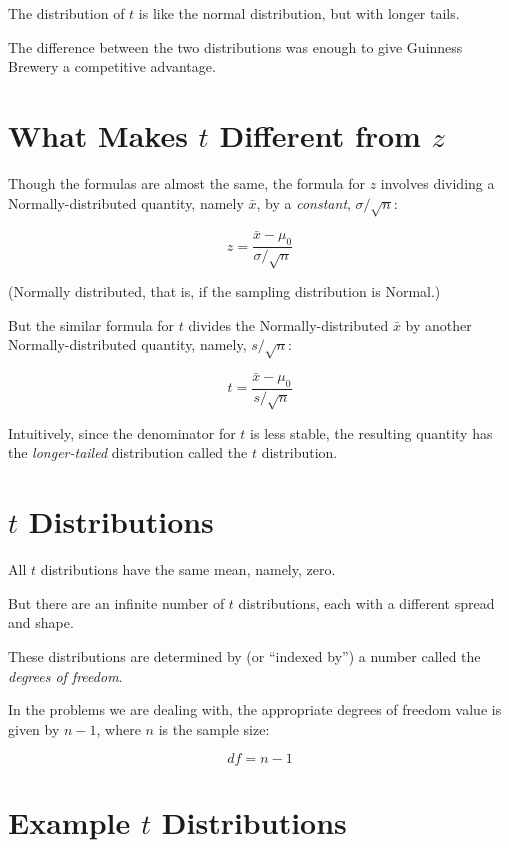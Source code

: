 \documentclass[
  letterpaper,
  DIV=11,
  numbers=noendperiod]{scrreprt}
\begin{document}
The distribution of \(t\) is like the normal distribution, but with
longer tails.

The difference between the two distributions was enough to give Guinness
Brewery a competitive advantage.

\section{\texorpdfstring{What Makes \(t\) Different from
\(z\)}{What Makes t Different from z}}\label{what-makes-t-different-from-z-1}

Though the formulas are almost the same, the formula for \(z\) involves
dividing a Normally-distributed quantity, namely \(\bar{x}\), by a
\emph{constant}, \(\sigma/\sqrt{n}\):

\[
z = \frac{\bar{x} - \mu_0}{\sigma/\sqrt{n}}
\]

(Normally distributed, that is, if the sampling distribution is Normal.)

But the similar formula for \(t\) divides the Normally-distributed
\(\bar{x}\) by another Normally-distributed quantity, namely,
\(s/\sqrt{n}\):

\[
t = \frac{\bar{x} - \mu_0}{s/\sqrt{n}}
\]

Intuitively, since the denominator for \(t\) is less stable, the
resulting quantity has the \emph{longer-tailed} distribution called the
\(t\) distribution.

\section{\texorpdfstring{\(t\)
Distributions}{t Distributions}}\label{t-distributions-1}

All \(t\) distributions have the same mean, namely, zero.

But there are an infinite number of \(t\) distributions, each with a
different spread and shape.

These distributions are determined by (or ``indexed by'') a number
called the \emph{degrees of freedom}.

In the problems we are dealing with, the appropriate degrees of freedom
value is given by \(n - 1\), where \(n\) is the sample size:

\[
df = n - 1
\]

\section{\texorpdfstring{Example \(t\)
Distributions}{Example t Distributions}}\label{example-t-distributions-1}
\end{document}
